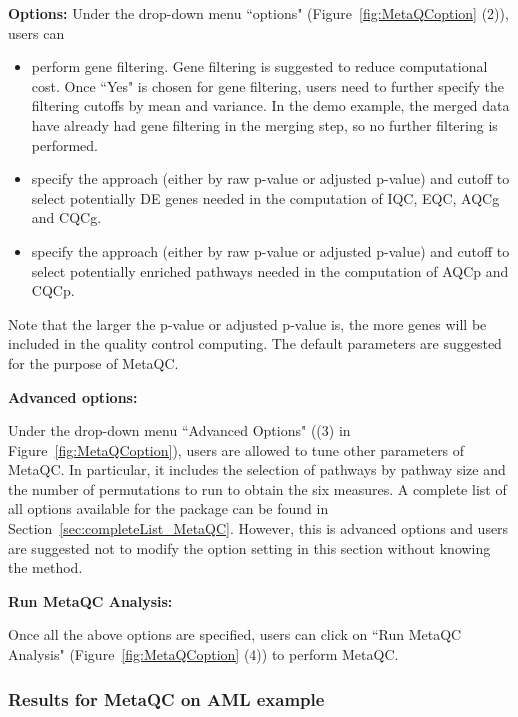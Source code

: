 \begin{steps}
\item \textbf{Options:}
Under the drop-down menu ``options" (Figure~\ref{fig:MetaQCoption} {\color{red}(2)}),
users can 

\begin{itemize}
\item perform gene filtering. Gene filtering is suggested to reduce computational cost. Once ``Yes" is chosen for gene filtering, 
users need to further specify the filtering cutoffs by mean and variance. 
In the demo example, 
the merged data have already had gene filtering in the merging step, so no further filtering is performed. 
\item specify the approach (either by raw p-value or adjusted p-value) and cutoff to select potentially DE genes needed in the computation of IQC, EQC, AQCg and CQCg.
\item specify the approach (either by raw p-value or adjusted p-value) and cutoff to select potentially enriched pathways needed in the computation of AQCp and CQCp.
\end{itemize}
Note that the larger the p-value or adjusted p-value is, 
the more genes will be included in the quality control computing.
The default parameters are suggested for the purpose of MetaQC.

\item \textbf{Advanced options:}



Under the drop-down menu ``Advanced Options" ({\color{red}(3)} in Figure~\ref{fig:MetaQCoption}), users are allowed to tune other parameters of MetaQC.
In particular, it includes the selection of pathways by pathway size and the number of permutations to run to obtain the six measures. 
A complete list of all options available for the package can be found in Section~\ref{sec:completeList_MetaQC}. 
However, this is advanced options and users are suggested not to modify the option setting in this section without knowing the method. 

\item \textbf{Run MetaQC Analysis:}

Once all the above options are specified, users can click on ``Run MetaQC Analysis" (Figure~\ref{fig:MetaQCoption}  {\color{red}(4)}) to 
perform MetaQC. 

\end{steps}



\subsubsection{Results for MetaQC on AML example}

